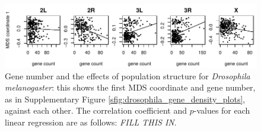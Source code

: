 \documentclass[11pt, oneside]{article}   	%
\newcommand{\plr}[1]{{\em \color{blue} #1}}
\begin{document}
\begin{figure}
    \begin{center}
        \includegraphics{MDS_against_gene_count_allchr_drosophila_win104}
    \end{center}
    \caption{
        Gene number and the effects of population structure for \textit{Drosophila melanogaster}:
        this shows the first MDS coordinate and gene number, as in Supplementary Figure \ref{sfig:drosophila_gene_density_plots},
        against each other.
        The correlation coefficient and $p$-values for each linear regression are as follows:
        \plr{FILL THIS IN}.
% 
% 
% 
% 
% 
% 
% 
% 
% 
% 
% 
% 
% 
% 
% 
% 
% 
% 
}
\end{figure}
\end{document}
